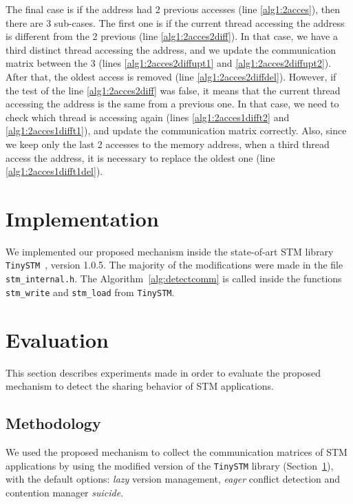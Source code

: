 The final case is if the address had 2 previous accesses (line \ref{alg1:2acces}), then there are 3 sub-cases. The first one is if the current thread accessing the address is different from the 2 previous (line \ref{alg1:2acces2diff}). In that case, we have a third distinct thread accessing the address, and we update the communication matrix between the 3 (lines \ref{alg1:2acces2diffupt1} and \ref{alg1:2acces2diffupt2}). After that, the oldest access is removed (line \ref{alg1:2acces2diffdel}). However, if the test of the line \ref{alg1:2acces2diff} was false, it means that the current thread accessing the address is the same from a previous one. In that case, we need to check which thread is accessing again (lines \ref{alg1:2acces1difft2} and \ref{alg1:2acces1difft1}), and update the communication matrix correctly. Also, since we keep only the last 2 accesses to the memory address, when a third thread access the address, it is necessary to replace the oldest one (line \ref{alg1:2acces1difft1del}).

\section{Implementation}\label{sec:implement}

We implemented our proposed mechanism inside the state-of-art STM library \texttt{TinySTM}~\cite{TinySTM2}, version 1.0.5. The majority of the modifications were made in the file \texttt{stm\_internal.h}. The Algorithm~\ref{alg:detectcomm} is called inside the functions \texttt{stm\_write} and \texttt{stm\_load} from \texttt{TinySTM}. 

\section{Evaluation}

This section describes experiments made in order to evaluate the proposed mechanism to detect the sharing behavior of STM applications.

\subsection{Methodology}\label{sec:mechMethodology}

We used the proposed mechanism to collect the communication matrices of STM applications by using the modified version of the \texttt{TinySTM} library (Section~\ref{sec:implement}), with the default options: \emph{lazy} version management, \emph{eager} conflict detection and contention manager \emph{suicide}.

